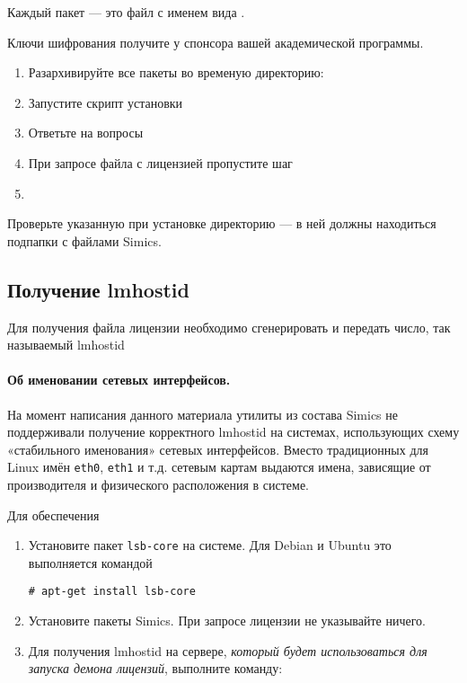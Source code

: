 Каждый пакет --- это файл с именем вида \todo{}. 

Ключи шифрования получите у спонсора вашей академической программы.

\begin{enumerate}
    \item Разархивируйте все пакеты во временую директорию:
    
    
    \item Запустите скрипт установки
    
    
    \item Ответьте на вопросы
    
    \item При запросе файла с лицензией пропустите шаг
    
    \item 
\end{enumerate}

Проверьте указанную при установке директорию --- в ней должны находиться подпапки с файлами Simics.

\subsection{Получение lmhostid}

Для получения файла лицензии необходимо сгенерировать и передать число, так называемый lmhostid

\paragraph{Об именовании сетевых интерфейсов.} На момент написания данного материала утилиты из состава Simics не поддерживали получение корректного lmhostid на системах, использующих схему «стабильного именования» сетевых интерфейсов. Вместо традиционных для Linux имён \texttt{eth0}, \texttt{eth1} и т.д. сетевым картам выдаются имена, зависящие от производителя и физического расположения в системе.

Для обеспечения \todo

\begin{enumerate}
    \item Установите пакет \texttt{lsb-core} на системе. Для Debian и Ubuntu это выполняется командой 
    
    \texttt{\# apt-get install lsb-core}
    
    
    \item Установите пакеты Simics. При запросе лицензии не указывайте ничего.
    
    \item Для получения lmhostid на сервере, \textit{который будет использоваться для запуска демона лицензий}, выполните команду:
\end{enumerate}



